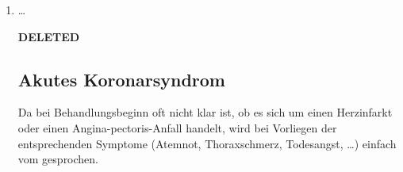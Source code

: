 \documentclass[
ngerman,
paper=a4,
asymmetric,
fontsize=10pt,
headings=small,
draft=false,
numbers=noenddot,
bibtotocnumbered,
footnotes=multiple,
]{scrreprt}
\newcommand{\jALT}{{\color{red}\sffamily\textbf{DELETED}\hrulefill\newline\newline}}
\newcommand{\jALTende}{\newline{\color{red}\rule{\linewidth}{2pt}\newline}}
\newcommand{\jNEU}{{\color{green}\sffamily\textbf{ADDED}\hrulefill\newline\newline}}
\newcommand{\jNEUende}{\newline{\color{green}\rule{\linewidth}{3pt}\newline}}
\begin{document}
\begin{enumerate}
{Bei Auftreten eines  können die
entsprechenden Schockzeichen beobachtet werden: Blässe,
Kaltschweißigkeit, Hypotonie, etc.
(\ref{topic:schock-kardiogener}).
}{
 \begin{itemize}
  \item Symptome wie bei Angina Pectoris, diese vergehen aber nicht
\end{itemize}
}
{./images/hirtler-aass/Herzschmerz.pdf}
{Schmerzausdehnung beim ischämischen
Herzschmerz.}
{Hirtler.}
\jALTende

\jNEU
\Text
{Herzinfarkt}
{

Die Symptome entsprechen denen des akuten Koronarsyndroms, doch vergehen diese nicht mehr und es bleiben --
selbst bei optimaler Behandlung -- Schäden am Herzmuskel
bestehen. 
 
}
 {%
 \begin{itemize}
  \item Symptome des kuten Koronarsyndroms,  vergehen
   nicht
 
\end{itemize}}
{}
{}
{}
\jNEUende

\item \ldots

\jALT
\subsection{Akutes Koronarsyndrom}

Da bei Behandlungsbeginn oft nicht klar ist, ob es sich um
einen Herzinfarkt oder einen Angina-pectoris-Anfall handelt,
wird bei Vorliegen der entsprechenden Symptome (Atemnot,
Thoraxschmerz, Todesangst, \ldots) einfach vom  gesprochen. 
\jALTende


\end{enumerate}
\end{document}
